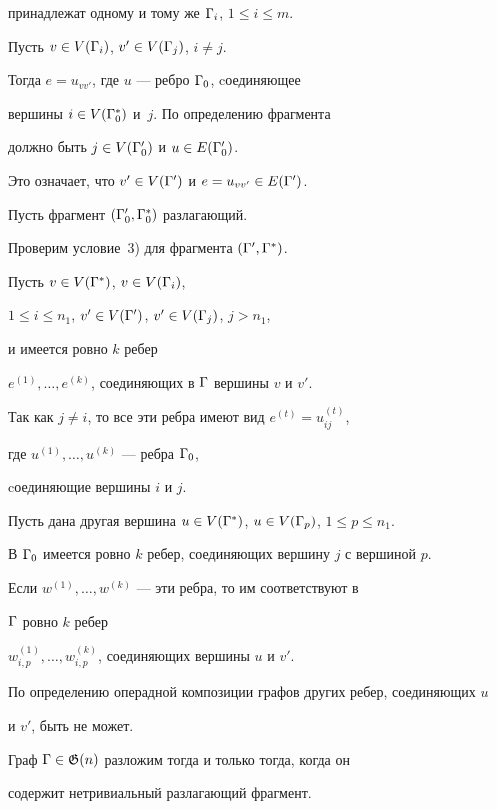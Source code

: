 \begin{pf}
принадлежат одному и тому же ${\Gamma}_i$, $1\leq i\leq m$.


Пусть $v\in V({\Gamma}_i)$, $v'\in V({\Gamma}_j)$, $i\ne j$. 


Тогда $e=u_{vv'}$, где $u$ --- ребро ${\Gamma}_0$, cоединяющее


вершины $i\in V({\Gamma}^*_0)$ и~$j$. По определению фрагмента 


должно быть $j\in V({\Gamma}'_0)$ и $u\in E({\Gamma}'_0)$.


Это означает, что $v'\in V({\Gamma}')$ и $e=u_{vv'}\in E({\Gamma}')$. 





Пусть фрагмент $({\Gamma}'_0, {\Gamma}^*_0)$ разлагающий. 


Проверим условие~3) для фрагмента $({\Gamma}', {\Gamma}^*)$.


Пусть $v\in V({\Gamma}^*)$, $v\in V({\Gamma}_i)$, 


$1\leq i\leq n_1$, $v'\in V({\Gamma}')$, $v'\in V({\Gamma}_j)$, $j>n_1$, 


и имеется ровно $k$ ребер


$e^{(1)}, \dotsc , e^{(k)}$, соединяющих в ${\Gamma}$ вершины $v$ и $v'$.


Так как $j\ne i$, то все эти ребра имеют вид $e^{(t)}=u_{ij}^{(t)}$,


где $u^{(1)}, \dotsc , u^{(k)}$ --- ребра ${\Gamma}_0$,


cоединяющие вершины $i$ и $j$.


Пусть дана другая вершина $u\in V({\Gamma}^*)$, $u\in V({\Gamma}_p)$, $1\leq p\leq n_1$.


В ${\Gamma}_0$ имеется ровно $k$ ребер, соединяющих вершину $j$ с вершиной $p$.


Если $w^{(1)}, \dotsc , w^{(k)}$ --- эти ребра, то им соответствуют в


${\Gamma}$ ровно $k$ ребер


$w^{(1)}_{i, p}, \dotsc , w^{(k)}_{i, p}$, соединяющих вершины $u$ и $v'$.


По определению операдной композиции графов других ребер, соединяющих $u$


и $v'$, быть не может.


\end{pf}





\begin{thm}


Граф ${\Gamma}\in {\frak G} (n)$ разложим тогда и только тогда, когда он


содержит нетривиальный разлагающий фрагмент.


\end{thm}





